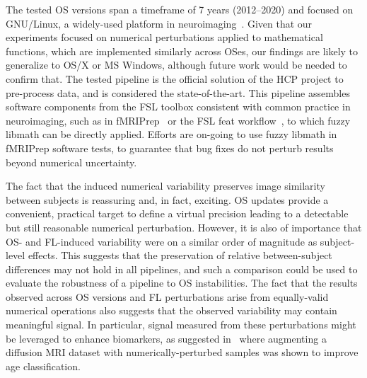 The tested OS versions span a timeframe of 7 years
(2012--2020) and focused on GNU/Linux, a widely-used platform in neuroimaging~\cite{hanke2011neuroscience}.
Given that our experiments focused on numerical perturbations applied to mathematical functions, 
which are implemented similarly across OSes,
our findings are likely to generalize 
to OS/X or MS Windows, although future work would be needed to confirm that. 
The tested pipeline is the official solution of the HCP
project to pre-process data, and is considered the state-of-the-art. This pipeline
assembles software components from the FSL
toolbox consistent with common practice in neuroimaging, such as in
fMRIPrep~\cite{esteban2019fmriprep} or the FSL feat workflow~\cite{jenkinson2012fsl},
to which fuzzy libmath can be directly applied. 
 Efforts are on-going to use fuzzy libmath in fMRIPrep software tests,
 to guarantee that bug fixes do not perturb results beyond numerical uncertainty. 

The fact that the induced numerical variability preserves
image similarity between subjects is reassuring and, in fact, exciting. OS updates
provide a convenient, practical target to define a virtual precision
leading to a detectable but still reasonable numerical perturbation. However, it is also
of importance that OS- and FL-induced variability were on a similar
order of magnitude as subject-level effects. This suggests that the preservation of relative
between-subject differences may not hold in all pipelines, and such a comparison could be
used to evaluate the robustness of a pipeline to OS instabilities.
The fact that the results observed across OS versions and FL perturbations arise
from equally-valid numerical operations also suggests that the observed variability
may contain meaningful signal.
In particular, signal measured from these perturbations might be leveraged to
enhance biomarkers, as suggested in~\cite{kiar2020data} where augmenting a
diffusion MRI dataset with numerically-perturbed samples was shown to
improve age classification.
